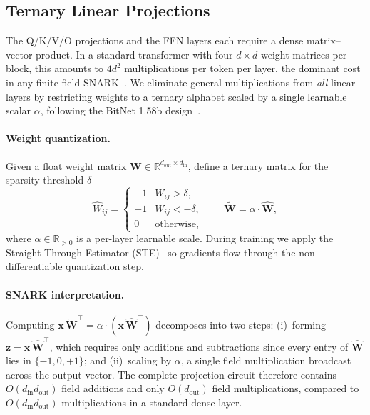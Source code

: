 \documentclass{article}
\newcommand{\RR}{\mathbb{R}}          %
\newcommand{\bx}{\mathbf{x}}
\newcommand{\bz}{\mathbf{z}}
\newcommand{\bW}{\mathbf{W}}
\begin{document}
\subsection{Ternary Linear Projections}
\label{subsec:ternary}

The Q/K/V/O projections and the FFN layers each require a dense
matrix–vector product.  In a standard transformer with four
$d\times d$ weight matrices per block, this amounts to $4d^2$
multiplications per token per layer, the dominant cost in any finite-field SNARK~\cite{qu2025zkgpt}.  We eliminate general multiplications from \emph{all} linear layers by restricting weights to a ternary alphabet scaled by a single learnable scalar $\alpha$, following the BitNet 1.58b design~\cite{ma2025bitnet}.

\paragraph{Weight quantization.}
Given a float weight matrix $\bW\in\RR^{d_{\mathrm{out}}\times d_{\mathrm{in}}}$,
define a ternary matrix for the sparsity threshold $\delta$
\begin{equation}
  \widehat{W}_{ij} =
  \begin{cases}
    +1 & W_{ij} > \delta, \\
    -1 & W_{ij} < -\delta, \\
     0 & \text{otherwise},
  \end{cases}
  \qquad
  \widetilde{\bW} = \alpha\cdot\widehat{\bW},
  \label{eq:ternary}
\end{equation}
where $\alpha\in\RR_{>0}$ is a per-layer learnable scale.  During
training we apply the Straight-Through Estimator
(STE)~\cite{bengio2013estimating} so gradients flow through the non-differentiable quantization step.

\paragraph{SNARK interpretation.}
Computing $\bx\,\widetilde{\bW}^\top = \alpha\cdot(\bx\,\widehat{\bW}^\top)$
decomposes into two steps: (i)~forming
$\bz = \bx\,\widehat{\bW}^\top$, which requires only additions and
subtractions since every entry of $\widehat{\bW}$ lies in
$\{-1,0,+1\}$; and (ii)~scaling by $\alpha$, a single field
multiplication broadcast across the output vector.  The complete
projection circuit therefore contains $O(d_{\mathrm{in}} d_{\mathrm{out}})$
field additions and only $O(d_{\mathrm{out}})$ field multiplications,
compared to $O(d_{\mathrm{in}} d_{\mathrm{out}})$ multiplications in a
standard dense layer.
\end{document}
